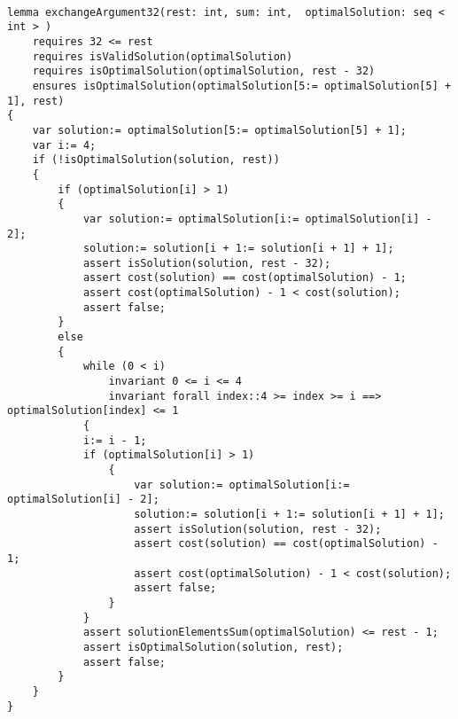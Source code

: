 \begin{lstlisting}
    
lemma exchangeArgument32(rest: int, sum: int,  optimalSolution: seq < int > )
    requires 32 <= rest
    requires isValidSolution(optimalSolution)
    requires isOptimalSolution(optimalSolution, rest - 32)
    ensures isOptimalSolution(optimalSolution[5:= optimalSolution[5] + 1], rest) 
{
    var solution:= optimalSolution[5:= optimalSolution[5] + 1];
    var i:= 4;
    if (!isOptimalSolution(solution, rest)) 
    {
        if (optimalSolution[i] > 1) 
        {
            var solution:= optimalSolution[i:= optimalSolution[i] - 2];
            solution:= solution[i + 1:= solution[i + 1] + 1];
            assert isSolution(solution, rest - 32);
            assert cost(solution) == cost(optimalSolution) - 1;
            assert cost(optimalSolution) - 1 < cost(solution);
            assert false;
        } 
        else
        {
            while (0 < i)
                invariant 0 <= i <= 4
                invariant forall index::4 >= index >= i ==> optimalSolution[index] <= 1 
            {
            i:= i - 1;
            if (optimalSolution[i] > 1) 
                {
                    var solution:= optimalSolution[i:= optimalSolution[i] - 2];
                    solution:= solution[i + 1:= solution[i + 1] + 1];
                    assert isSolution(solution, rest - 32);
                    assert cost(solution) == cost(optimalSolution) - 1;
                    assert cost(optimalSolution) - 1 < cost(solution);
                    assert false;
                }
            }
            assert solutionElementsSum(optimalSolution) <= rest - 1;
            assert isOptimalSolution(solution, rest);
            assert false;
        }
    }
}
\end{lstlisting}
